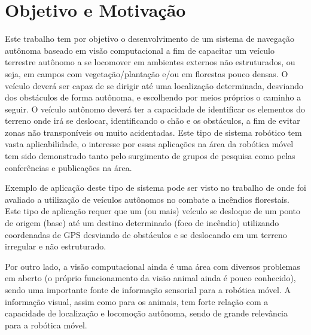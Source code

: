\section{Objetivo e Motivação}

Este trabalho tem por objetivo o desenvolvimento de um sistema de navegação
autônoma baseado em visão computacional a fim de capacitar um veículo terrestre
autônomo a se locomover em ambientes externos não estruturados, ou seja, em
campos com vegetação/plantação e/ou em florestas pouco densas. O veículo deverá
ser capaz de se dirigir até uma localização determinada, desviando dos
obstáculos de forma autônoma, e escolhendo por meios próprios o
caminho a seguir. O veículo autônomo deverá ter a capacidade de identificar os
elementos do terreno onde irá se deslocar, identificando o chão e os obstáculos,
a fim de evitar zonas não transponíveis ou muito acidentadas. Este tipo de
sistema robótico tem vasta aplicabilidade, o interesse por essas aplicações na
área da robótica móvel tem sido demonstrado tanto pelo surgimento de grupos de
pesquisa como pelas conferências e publicações na área.

Exemplo de aplicação deste tipo de sistema pode ser visto no trabalho de
\cite{Pessin2008} onde foi avaliado a utilização de veículos autônomos no
combate a incêndios florestais. Este tipo de aplicação requer que um (ou mais)
veículo se desloque de um ponto de origem (base) até um destino determinado
(foco de incêndio) utilizando coordenadas de GPS desviando de obstáculos e se
deslocando em um terreno irregular e não estruturado.

Por outro lado, a visão computacional ainda é uma área com diversos problemas em
aberto (o próprio funcionamento da visão animal ainda é pouco conhecido), sendo
uma importante fonte de informação sensorial para a robótica móvel. A informação
visual, assim como para os animais, tem forte relação com a capacidade de
localização e locomoção autônoma, sendo de grande relevância para a robótica
móvel.



